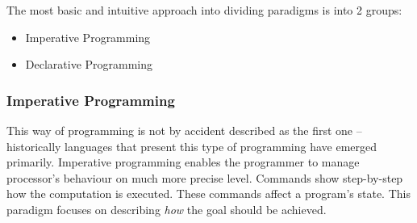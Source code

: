     The most basic and intuitive approach into dividing paradigms is into 2 groups:
    \begin{itemize}
        \item Imperative Programming
        \item Declarative Programming
    \end{itemize}
    
    \subsubsection{Imperative Programming}
    This way of programming is not by accident described as the first one -- historically languages that present this type of programming have emerged primarily. Imperative programming enables the programmer to manage processor's behaviour on much more precise level. Commands show step-by-step how the computation is executed. These commands affect a program's state. This paradigm focuses on describing \textit{how} the goal should be achieved.
    
